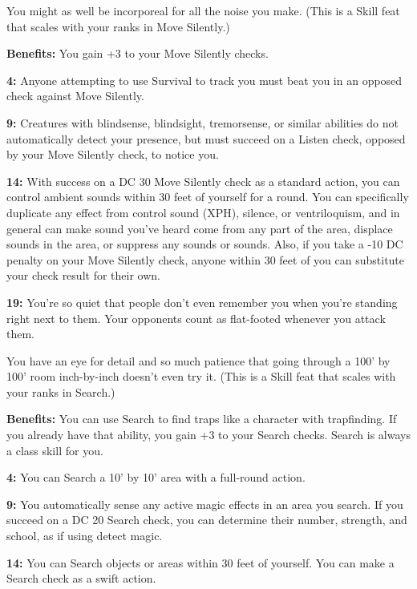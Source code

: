 
You might as well be incorporeal for all the noise you make. (This is a Skill feat that scales with your ranks in Move Silently.)

\textbf{Benefits:} You gain +3 to your Move Silently checks.

\textbf{4:} Anyone attempting to use Survival to track you must beat you in an opposed check against Move Silently.

\textbf{9:} Creatures with blindsense, blindsight, tremorsense, or similar abilities do not automatically detect your presence, but must succeed on a Listen check, opposed by your Move Silently check, to notice you.

\textbf{14:} With success on a DC 30 Move Silently check as a standard action, you can control ambient sounds within 30 feet of yourself for a round. You can specifically duplicate any effect from control sound (XPH), silence, or ventriloquism, and in general can make sound you've heard come from any part of the area, displace sounds in the area, or suppress any sounds or sounds. Also, if you take a -10 DC penalty on your Move Silently check, anyone within 30 feet of you can substitute your check result for their own.

\textbf{19:} You're so quiet that people don't even remember you when you're standing right next to them. Your opponents count as flat-footed whenever you attack them.


You have an eye for detail and so much patience that going through a 100' by 100' room inch-by-inch doesn't even try it. (This is a Skill feat that scales with your ranks in Search.)

\textbf{Benefits:} You can use Search to find traps like a character with trapfinding. If you already have that ability, you gain +3 to your Search checks. Search is always a class skill for you.

\textbf{4:} You can Search a 10' by 10' area with a full-round action.

\textbf{9:} You automatically sense any active magic effects in an area you search. If you succeed on a DC 20 Search check, you can determine their number, strength, and school, as if using detect magic.

\textbf{14:} You can Search objects or areas within 30 feet of yourself. You can make a Search check as a swift action.

